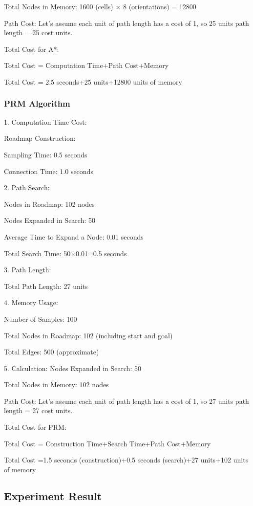 \documentclass[9pt,a4paper,twoside]{rho-class/rho}
\begin{document}
    Total Nodes in Memory: 1600 (cells) × 8 (orientations) = 12800

    Path Cost: Let's assume each unit of path length has a cost of 1, so 25 units path length = 25 cost units.

    Total Cost for A*:

    Total Cost = Computation Time+Path Cost+Memory 

    Total Cost = 2.5 seconds+25 units+12800 units of memory

    \subsubsection{PRM Algorithm}

    1. Computation Time Cost:

    Roadmap Construction:

    Sampling Time: 0.5 seconds

    Connection Time: 1.0 seconds

    2. Path Search:

    Nodes in Roadmap: 102 nodes

    Nodes Expanded in Search: 50

    Average Time to Expand a Node: 0.01 seconds

    Total Search Time: 50×0.01=0.5 seconds

    3. Path Length:

    Total Path Length: 27 units

    4. Memory Usage:

    Number of Samples: 100

    Total Nodes in Roadmap: 102 (including start and goal)

    Total Edges: 500 (approximate)

    5. Calculation:
    Nodes Expanded in Search: 50

    Total Nodes in Memory: 102 nodes

    Path Cost: Let's assume each unit of path length has a cost of 1, so 27 units path length = 27 cost units.

    Total Cost for PRM:

    Total Cost = Construction Time+Search Time+Path Cost+Memory

    Total Cost =1.5 seconds (construction)+0.5 seconds (search)+27 units+102 units of memory

    \subsection{Experiment Result}
\end{document}
